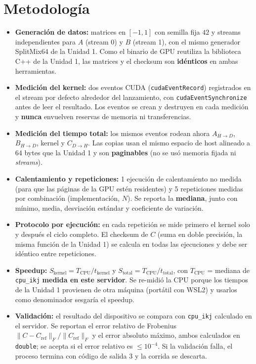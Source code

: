\section{Metodología}

	\begin{itemize}
		\item \textbf{Generación de datos:} matrices en $[-1, 1]$ con semilla fija $42$ y streams independientes para $A$ (stream 0) y $B$ (stream 1), con el mismo generador SplitMix64 de la Unidad 1. Como el binario de GPU reutiliza la biblioteca C++ de la Unidad 1, las matrices y el checksum son \textbf{idénticos} en ambas herramientas.
		\item \textbf{Medición del kernel:} dos eventos CUDA (\texttt{cudaEventRecord}) registrados en el stream por defecto alrededor del lanzamiento, con \texttt{cudaEventSynchronize} antes de leer el resultado. Los eventos se crean y destruyen en cada medición y \textbf{nunca} envuelven reservas de memoria ni transferencias.
		\item \textbf{Medición del tiempo total:} los mismos eventos rodean ahora $A_{H\to D}$, $B_{H\to D}$, kernel y $C_{D\to H}$. Las copias usan el mismo espacio de host alineado a 64 bytes que la Unidad 1 y son \textbf{paginables} (no se usó memoria fijada ni \textit{streams}).
		\item \textbf{Calentamiento y repeticiones:} 1 ejecución de calentamiento no medida (para que las páginas de la GPU estén residentes) y 5 repeticiones medidas por combinación (implementación, $N$). Se reporta la \textbf{mediana}, junto con mínimo, media, desviación estándar y coeficiente de variación.
		\item \textbf{Protocolo por ejecución:} en cada repetición se mide primero el kernel solo y después el ciclo completo. El checksum de $C$ (suma en doble precisión, la misma función de la Unidad 1) se calcula en todas las ejecuciones y debe ser idéntico entre repeticiones.
		\item \textbf{Speedup:} $S_{\text{kernel}} = T_{\text{CPU}} / t_{\text{kernel}}$ y $S_{\text{total}} = T_{\text{CPU}} / t_{\text{total}}$, con $T_{\text{CPU}}$ = mediana de \texttt{cpu\_ikj} \textbf{medida en este servidor}. Se re-midió la CPU porque los tiempos de la Unidad 1 provienen de otra máquina (portátil con WSL2) y usarlos como denominador sesgaría el speedup.
		\item \textbf{Validación:} el resultado del dispositivo se compara con \texttt{cpu\_ikj} calculado en el servidor. Se reportan el error relativo de Frobenius $\lVert C - C_{\text{ref}} \rVert_F / \lVert C_{\text{ref}} \rVert_F$ y el error absoluto máximo, ambos calculados en \texttt{double}; se acepta si el error relativo es $\leq 10^{-4}$. Si la validación falla, el proceso termina con código de salida 3 y la corrida se descarta.

\end{itemize}
